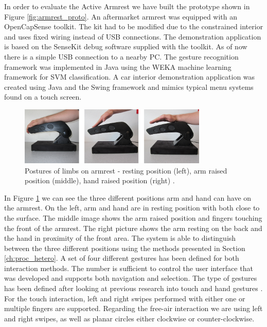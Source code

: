 In order to evaluate the Active Armrest we have built the prototype shown in Figure \ref{fig:armrest_proto}. An aftermarket armrest was equipped with an OpenCapSense toolkit. The kit had to be modified due to the constrained interior and uses fixed wiring instead of USB connections. The demonstration application is based on the SenseKit debug software supplied with the toolkit. As of now there is a simple USB connection to a nearby PC. The gesture recognition framework was implemented in Java using the WEKA machine learning framework for SVM classification. A car interior demonstration application was created using Java and the Swing framework and mimics typical menu systems found on a touch screen.

\begin{figure}[ht]
\centering
\includegraphics[width=0.8\textwidth]{images/armrest_postures}
\caption{Postures of limbs on armrest - resting position (left),  arm raised position (middle), hand raised position (right) \cite{braun2013ActiveArmrest}.}
\label{fig:armrest_postures}
\end{figure}

In Figure \ref{fig:armrest_postures} we can see the three different positions arm and hand can have on the armrest. On the left, arm and hand are in resting position with both close to the surface. The middle image shows the arm raised position and fingers touching the front of the armrest. The right picture shows the arm resting on the back and the hand in proximity of the front area. The system is able to distinguish between the three different positions using the methods presented in Section \ref{ch:proc_hetero}. A set of four different gestures has been defined for both interaction methods. The number is sufficient to control the user interface that was developed and supports both navigation and selection. The type of gestures has been defined after looking at previous research into touch and hand gestures \cite{bragdon2011experimental, wachs2011vision}. For the touch interaction, left and right swipes performed with either one or multiple fingers are supported. Regarding the free-air interaction we are using left and right swipes, as well as planar circles either clockwise or counter-clockwise.

